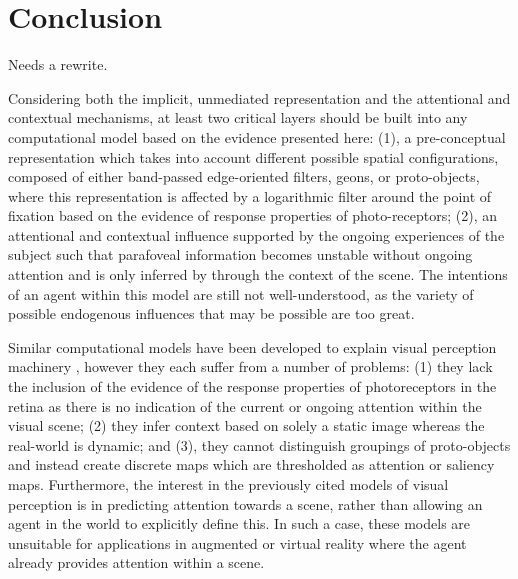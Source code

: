 \documentclass[a4paper,10pt,final]{ThesisStyle}
\begin{document}
\section{Conclusion}

Needs a rewrite.

Considering both the implicit, unmediated representation and the attentional and contextual mechanisms, at least two critical layers should be built into any computational model based on the evidence presented here:  (1), a pre-conceptual representation which takes into account different possible spatial configurations, composed of either band-passed edge-oriented filters, geons, or proto-objects, where this representation is affected by a logarithmic filter around the point of fixation based on the evidence of response properties of photo-receptors; (2), an attentional and contextual influence supported by the ongoing experiences of the subject such that parafoveal information becomes unstable without ongoing attention and is only inferred by through the context of the scene.  The intentions of an agent within this model are still not well-understood, as the variety of possible endogenous influences that may be possible are too great.  

Similar computational models have been developed to explain visual perception machinery \cite{Walther2006,Orabona2007a}, however they each suffer from a number of problems: (1) they lack the inclusion of the evidence of the response properties of photoreceptors in the retina as there is no indication of the current or ongoing attention within the visual scene; (2) they infer context based on solely a static image whereas the real-world is dynamic; and (3), they cannot distinguish groupings of proto-objects and instead create discrete maps which are thresholded as attention or saliency maps.  Furthermore, the interest in the previously cited models of visual perception is in predicting attention towards a scene, rather than allowing an agent in the world to explicitly define this.  In such a case, these models are unsuitable for applications in augmented or virtual reality where the agent already provides attention within a scene.  




\end{document}
